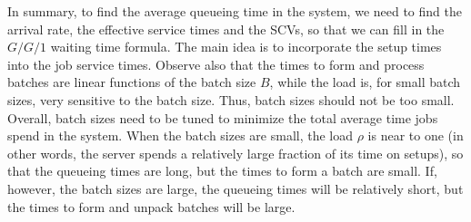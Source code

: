 \begin{comment}
\begin{exercise}
  Suppose a single machine workstation has to process $n$ different
  product families. Jobs of family $i$ arrive as a Poisson process
  with rate $\lambda_i$.  Service times are exponentially distributed
  with average $\mu_i^{-1}$ for family $i$. A setup of time $S$ is
  required if the machine switches from one family to another. If the
  machine works according to a cyclic schedule, i.e., produce family
  1, then 2, then 3, and so on until family $n$, Can you find batch
  sizes $B_i$ for family $i$ such that an average waiting time can be
  guaranteed?
  \begin{solution}
    \TBD. 

    This problem can be generalized and has been widely studied as one
    of the core problems in stochastic machine scheduling. For
    instance, what to do if the setup times are family-dependent, or
    even more general, dependent on the sequence in which the families
    are planned? This is a very hard problem. 
  \end{solution}
\end{exercise}
\end{comment}


In summary, to find the average  queueing time in the system, we need to find the arrival rate, the effective service times and the SCVs, so that we can fill in the $G/G/1$ waiting time formula. The main idea is to incorporate the setup times into the job service times. Observe also that the times to form and process batches are linear functions of the batch size $B$, while the load is, for small batch sizes, very sensitive to the batch size. Thus, batch sizes should not be too small.  Overall, batch sizes need to be tuned to minimize the total average time jobs spend in the system. When the batch sizes are small, the load $\rho$ is near to one (in other words, the server spends a relatively large fraction of its time on setups), so that the queueing times are long, but the times to form a batch are small. If, however, the batch sizes are large, the queueing times will be relatively short, but the times to form and unpack batches will be large. 



